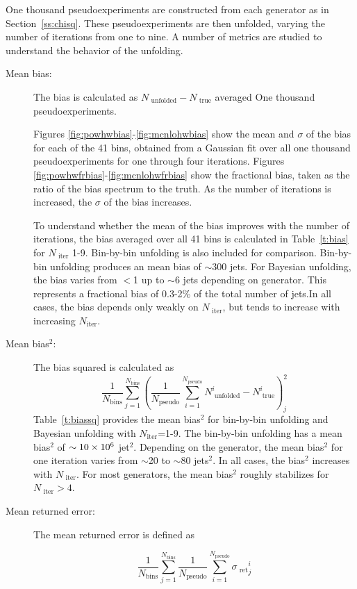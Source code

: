 One thousand pseudoexperiments are constructed from each generator as in Section~\ref{ss:chisq}. These pseudoexperiments are then unfolded, varying the number of iterations from one to nine. A number of metrics are studied to understand the behavior of the unfolding.
\begin{description}
\item[Mean bias:] The bias is calculated as $N_{\textrm{ unfolded}}-N_{\textrm{ true}}$ averaged One thousand pseudoexperiments.

Figures \ref{fig:powhwbias}-\ref{fig:mcnlohwbias} show the mean and $\sigma$ of the bias for each of the 41 bins, obtained from a Gaussian fit over all one thousand pseudoexperiments for one through four iterations. Figures \ref{fig:powhwfrbias}-\ref{fig:mcnlohwfrbias} show the fractional bias, taken as the ratio of the bias spectrum to the truth. As the number of iterations is increased, the $\sigma$ of the bias increases. 

To understand whether the mean of the bias improves with the number of iterations, the bias averaged over all 41 bins is calculated in Table~\ref{t:bias} for $N_{\textrm{ iter}}$ 1-9. Bin-by-bin unfolding is also included for comparison. Bin-by-bin unfolding produces an mean bias of $\sim$300 jets. For Bayesian unfolding, the bias varies from $<$1 up to $\sim$6 jets depending on generator. This represents a fractional bias of 0.3-2\% of the total number of jets.In all cases, the bias depends only weakly on $N_{\textrm{ iter}}$, but tends to increase with increasing $N_{\textrm{iter}}$.
\item[Mean bias$^2$:]The bias squared is calculated as
$$
\frac{1}{N_{\textrm{bins}}} \sum_{j=1}^{N_{\textrm{bins}}} \left (\frac{1}{N_{\textrm{pseudo}}} \sum_{i=1}^{N_{\textrm{pseudo}}} N^i_{\textrm{ unfolded}}-N^{i}_{\textrm{ true}} \right )_{j}^{2}
$$
Table~\ref{t:biassq} provides the mean bias$^{2}$ for bin-by-bin unfolding and Bayesian unfolding with $N_{\textrm{iter}}$=1-9. The bin-by-bin unfolding has a mean bias$^2$ of $\sim 10\times 10^{6}$ jet$^2$. Depending on the generator, the mean bias$^2$ for one iteration varies from $\sim$20 to $\sim$80 jets$^2$.  In all cases, the bias$^2$ increases with $N_{\textrm{ iter}}$. For most generators, the mean bias$^2$ roughly stabilizes for $N_{\textrm{ iter}} > 4$. 
\item[Mean \textrm{ret}urned error:] The mean \textrm{ ret}urned error is defined as

$$
\frac{1}{N_{\textrm{bins}}} \sum_{j=1}^{N_{\textrm{bins}}} \frac{1}{N_{\textrm{pseudo}}} \sum_{i=1}^{N_{\textrm{pseudo}}} {\sigma_{\textrm{ ret}}}^{i}_{j}
$$  


\end{description}
